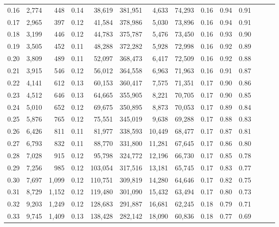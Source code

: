 \begin{tabular}{rrrrrrrrrrrrrr}
0.16 &   2,774 &    448 &  0.14 &   38,619 &  381,951 &   4,633 &  74,293 &  0.16 &  0.94 &      0.91 \\
0.17 &   2,965 &    397 &  0.12 &   41,584 &  378,986 &   5,030 &  73,896 &  0.16 &  0.94 &      0.91 \\
0.18 &   3,199 &    446 &  0.12 &   44,783 &  375,787 &   5,476 &  73,450 &  0.16 &  0.93 &      0.90 \\
0.19 &   3,505 &    452 &  0.11 &   48,288 &  372,282 &   5,928 &  72,998 &  0.16 &  0.92 &      0.89 \\
0.20 &   3,809 &    489 &  0.11 &   52,097 &  368,473 &   6,417 &  72,509 &  0.16 &  0.92 &      0.88 \\
0.21 &   3,915 &    546 &  0.12 &   56,012 &  364,558 &   6,963 &  71,963 &  0.16 &  0.91 &      0.87 \\
0.22 &   4,141 &    612 &  0.13 &   60,153 &  360,417 &   7,575 &  71,351 &  0.17 &  0.90 &      0.86 \\
0.23 &   4,512 &    646 &  0.13 &   64,665 &  355,905 &   8,221 &  70,705 &  0.17 &  0.90 &      0.85 \\
0.24 &   5,010 &    652 &  0.12 &   69,675 &  350,895 &   8,873 &  70,053 &  0.17 &  0.89 &      0.84 \\
0.25 &   5,876 &    765 &  0.12 &   75,551 &  345,019 &   9,638 &  69,288 &  0.17 &  0.88 &      0.83 \\
0.26 &   6,426 &    811 &  0.11 &   81,977 &  338,593 &  10,449 &  68,477 &  0.17 &  0.87 &      0.81 \\
0.27 &   6,793 &    832 &  0.11 &   88,770 &  331,800 &  11,281 &  67,645 &  0.17 &  0.86 &      0.80 \\
0.28 &   7,028 &    915 &  0.12 &   95,798 &  324,772 &  12,196 &  66,730 &  0.17 &  0.85 &      0.78 \\
0.29 &   7,256 &    985 &  0.12 &  103,054 &  317,516 &  13,181 &  65,745 &  0.17 &  0.83 &      0.77 \\
0.30 &   7,697 &  1,099 &  0.12 &  110,751 &  309,819 &  14,280 &  64,646 &  0.17 &  0.82 &      0.75 \\
0.31 &   8,729 &  1,152 &  0.12 &  119,480 &  301,090 &  15,432 &  63,494 &  0.17 &  0.80 &      0.73 \\
0.32 &   9,203 &  1,249 &  0.12 &  128,683 &  291,887 &  16,681 &  62,245 &  0.18 &  0.79 &      0.71 \\
0.33 &   9,745 &  1,409 &  0.13 &  138,428 &  282,142 &  18,090 &  60,836 &  0.18 &  0.77 &      0.69 \\

\end{tabular}
